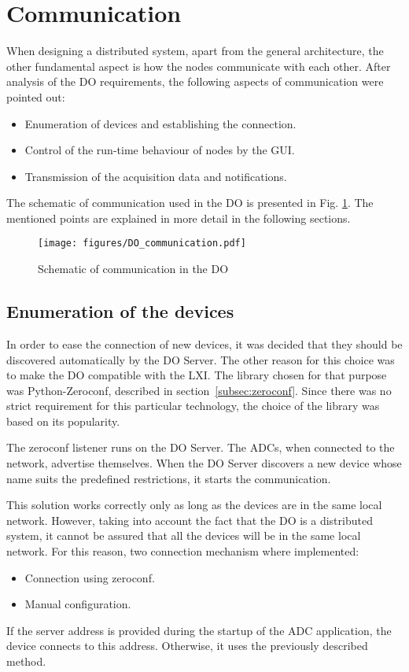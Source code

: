 \section{Communication} \label{section:communication}

    When designing a distributed system, apart from the general architecture, the other fundamental aspect is how the nodes communicate with each other. After analysis of the DO requirements, the following aspects of communication were pointed out:
    \begin{itemize}
        \item Enumeration of devices and establishing the connection. 
        \item Control of the run-time behaviour of nodes by the GUI.
        \item Transmission of the acquisition data and notifications.
    \end{itemize}
    The schematic of communication used in the DO is presented in Fig. \ref{fig:DO_communication}. The mentioned points are explained in more detail in the following sections.
    \begin{figure}
    	\centerline{\texttt{[image: figures/DO\_communication.pdf]}}
    	\caption{Schematic of communication in the DO}
    	\label{fig:DO_communication}
    \end{figure}

    \subsection{Enumeration of the devices} \label{section:enumeration_of_devices}
        In order to ease the connection of new devices, it was decided that they should be discovered automatically by the DO Server. The other reason for this choice was to make the DO compatible with the LXI. The library chosen for that purpose was Python-Zeroconf, described in section~\ref{subsec:zeroconf}. Since there was no strict requirement for this particular technology, the choice of the library was based on its popularity.
        
        The zeroconf listener runs on the DO Server. The ADCs, when connected to the network, advertise themselves. When the DO Server discovers a new device whose name suits the predefined restrictions, it starts the communication.
        
        This solution works correctly only as long as the devices are in the same local network. However, taking into account the fact that the DO is a distributed system, it cannot be assured that all the devices will be in the same local network. For this reason, two connection mechanism where implemented:
        \begin{itemize}
            \item Connection using zeroconf.
            \item Manual configuration.
        \end{itemize}
        If the server address is provided during the startup of the ADC application, the device connects to this address. Otherwise, it uses the previously described method.
    
